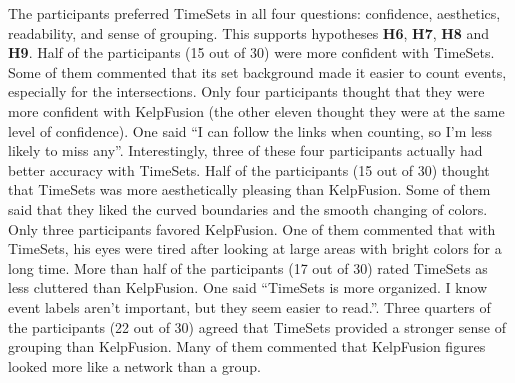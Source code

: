 The participants preferred TimeSets in all four questions: confidence, aesthetics, readability, and sense of grouping. This supports hypotheses \textbf{H6}, \textbf{H7}, \textbf{H8} and \textbf{H9}. Half of the participants (15 out of 30) were more confident with TimeSets. Some of them commented that its set background made it easier to count events, especially for the intersections. Only four participants thought that they were more confident with KelpFusion (the other eleven thought they were at the same level of confidence). One said ``I can follow the links when counting, so I'm less likely to miss any''. Interestingly, three of these four participants actually had better accuracy with TimeSets. Half of the participants (15 out of 30) thought that TimeSets was more aesthetically pleasing than KelpFusion. Some of them said that they liked the curved boundaries and the smooth changing of colors. Only three participants favored KelpFusion. One of them commented that with TimeSets, his eyes were tired after looking at large areas with bright colors for a long time. More than half of the participants (17 out of 30) rated TimeSets as less cluttered than KelpFusion. One said ``TimeSets is more organized. I know event labels aren't important, but they seem easier to read.''. Three quarters of the participants (22 out of 30) agreed that TimeSets provided a stronger sense of grouping than KelpFusion. Many of them commented that KelpFusion figures looked more like a network than a group.